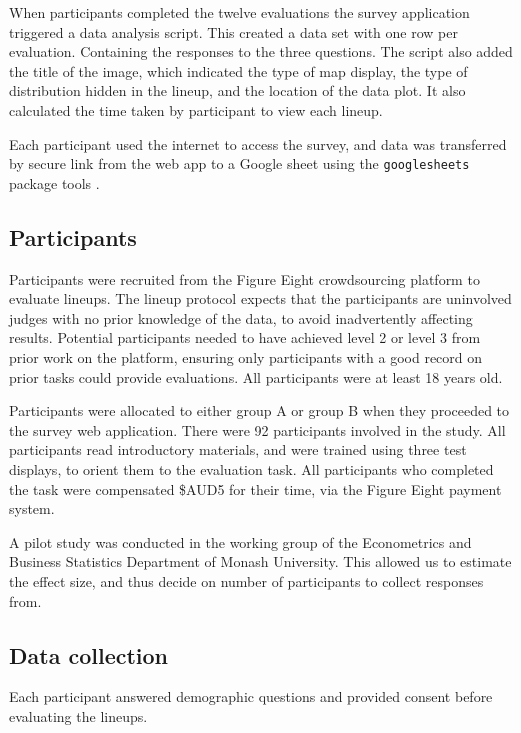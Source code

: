 \documentclass[
doublespace,
  times]{anzsauth}
\begin{document}
When participants completed the twelve evaluations the survey
application triggered a data analysis script. This created a data set
with one row per evaluation. Containing the responses to the three
questions. The script also added the title of the image, which indicated
the type of map display, the type of distribution hidden in the lineup,
and the location of the data plot. It also calculated the time taken by
participant to view each lineup.

Each participant used the internet to access the survey, and data was
transferred by secure link from the web app to a Google sheet using the
\texttt{googlesheets} package tools \citep{sheets}.

\subsection{Participants}\label{participants}

Participants were recruited from the Figure Eight crowdsourcing platform
\citep{figeight} to evaluate lineups. The lineup protocol expects that
the participants are uninvolved judges with no prior knowledge of the
data, to avoid inadvertently affecting results. Potential participants
needed to have achieved level 2 or level 3 from prior work on the
platform, ensuring only participants with a good record on prior tasks
could provide evaluations. All participants were at least 18 years old.

Participants were allocated to either group A or group B when they
proceeded to the survey web application. There were 92 participants
involved in the study. All participants read introductory materials, and
were trained using three test displays, to orient them to the evaluation
task. All participants who completed the task were compensated \$AUD5
for their time, via the Figure Eight payment system.

A pilot study was conducted in the working group of the Econometrics and
Business Statistics Department of Monash University. This allowed us to
estimate the effect size, and thus decide on number of participants to
collect responses from.

\subsection{Data collection}\label{data-collection}

Each participant answered demographic questions and provided consent
before evaluating the lineups.
\end{document}

